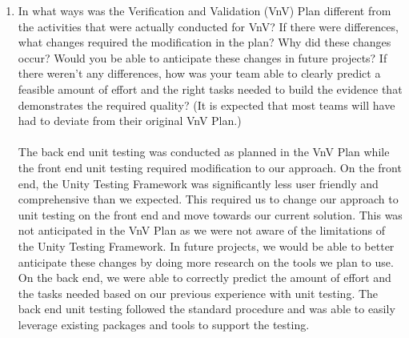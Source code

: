 \documentclass[12pt, titlepage]{article}
\begin{document}
\begin{enumerate}
  \item In what ways was the Verification and Validation (VnV) Plan different
  from the activities that were actually conducted for VnV?  If there were
  differences, what changes required the modification in the plan?  Why did
  these changes occur?  Would you be able to anticipate these changes in future
  projects?  If there weren't any differences, how was your team able to clearly
  predict a feasible amount of effort and the right tasks needed to build the
  evidence that demonstrates the required quality?  (It is expected that most
  teams will have had to deviate from their original VnV Plan.)
  \\
  \\
  The back end unit testing was conducted as planned in the VnV Plan while the front end unit testing required modification to our approach.
  On the front end, the Unity Testing Framework was significantly less user friendly and comprehensive than we expected.
  This required us to change our approach to unit testing on the front end and move towards our current solution.
  This was not anticipated in the VnV Plan as we were not aware of the limitations of the Unity Testing Framework.
  In future projects, we would be able to better anticipate these changes by doing more research on the tools we plan to use.
  On the back end, we were able to correctly predict the amount of effort and the tasks needed based on our previous experience with unit testing.
  The back end unit testing followed the standard procedure and was able to easily leverage existing packages and tools to support the testing.
\end{enumerate}
\end{document}
